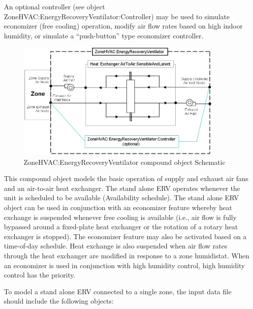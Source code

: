 An optional controller (see object ZoneHVAC:EnergyRecoveryVentilator:Controller) may be used to simulate economizer (free cooling) operation, modify air flow rates based on high indoor humidity, or simulate a ``push-button'' type economizer controller.

\begin{figure}[hbtp] %
\centering
\includegraphics[width=0.9\textwidth, height=0.9\textheight, keepaspectratio=true]{media/image293.png}
\caption{ZoneHVAC:EnergyRecoveryVentilator compound object Schematic \protect \label{fig:zonehvac-energyrecoveryventilator-compound}}
\end{figure}

This compound object models the basic operation of supply and exhaust air fans and an air-to-air heat exchanger. The stand alone ERV operates whenever the unit is scheduled to be available (Availability schedule). The stand alone ERV object can be used in conjunction with an economizer feature whereby heat exchange is suspended whenever free cooling is available (i.e., air flow is fully bypassed around a fixed-plate heat exchanger or the rotation of a rotary heat exchanger is stopped). The economizer feature may also be activated based on a time-of-day schedule. Heat exchange is also suspended when air flow rates through the heat exchanger are modified in response to a zone humidistat. When an economizer is used in conjunction with high humidity control, high humidity control has the priority.

To model a stand alone ERV connected to a single zone, the input data file should include the following objects:

